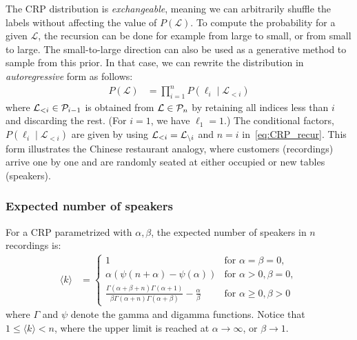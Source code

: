 \documentclass[a4paper,oneside,12pt,english]{report}
\def\expp#1{\bigl\langle#1\bigr\rangle}
\def\Lset{\mathcal{L}}
\begin{document}
The CRP distribution is \emph{exchangeable}, meaning we can arbitrarily shuffle the labels without affecting the value of $P(\Lset)$. To compute the probability for a given $\Lset$, the recursion can be done for example from large to small, or from small to large. The small-to-large direction can also be used as a generative method to sample from this prior. In that case, we can rewrite the distribution in \emph{autoregressive} form as follows:
\begin{align}
\label{eq:CRP_AR}
P(\Lset) &= \prod_{i=1}^n P(\ell_i\mid\Lset_{<i})
\end{align}
where $\Lset_{<i}\in\Pset_{i-1}$ is obtained from $\Lset\in\Pset_n$ by retaining all indices less than $i$ and discarding the rest. (For $i=1$, we have $\ell_1=1$.) The conditional factors, $P(\ell_i\mid\Lset_{<i})$ are given by using $\Lset_{<i}=\Li$ and $n=i$ in~\eqref{eq:CRP_recur}.  This form illustrates the Chinese restaurant analogy, where customers (recordings) arrive one by one and are randomly seated at either occupied or new  tables (speakers).   



\subsubsection{Expected number of speakers}
For a CRP parametrized with $\alpha,\beta$, the expected number of speakers in $n$ recordings is:
\begin{align}
\label{eq:CRP_ev}
\expp{k}{} &= \begin{cases}
1& \text{for $\alpha=\beta=0$},\\
\alpha(\psi(n+\alpha)-\psi(\alpha))&   \text{for $\alpha>0, \beta=0$}, \\
\frac{\Gamma(\alpha+\beta+n)\Gamma(\alpha+1)}{\beta\Gamma(\alpha+n)\Gamma(\alpha+\beta)}-\frac{\alpha}{\beta}&   \text{for $\alpha\ge0, \beta>0$}
\end{cases}
\end{align}
where $\Gamma$ and $\psi$ denote the gamma and digamma functions. Notice that $1\le\expp{k}<n$, where the upper limit is reached at $\alpha\to\infty$, or $\beta\to1$. 
\end{document}

